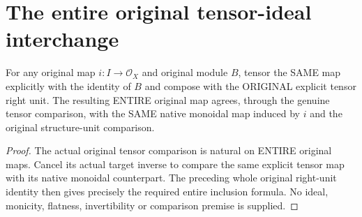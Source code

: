 \section{The entire original tensor-ideal interchange}

\begin{lemma}\label{sc0-tensor-ideal-shuffle:inclusion}
\leanok
{}
For any original map $i:I\to\mathcal O_X$ and original module $B$, tensor the SAME map explicitly with the identity of $B$ and compose with the ORIGINAL explicit tensor right unit. The resulting ENTIRE original map agrees, through the genuine tensor comparison, with the SAME native monoidal map induced by $i$ and the original structure-unit comparison.
\end{lemma}
\begin{proof}
The actual original tensor comparison is natural on ENTIRE original maps. Cancel its actual target inverse to compare the same explicit tensor map with its native monoidal counterpart. The preceding whole original right-unit identity then gives precisely the required entire inclusion formula. No ideal, monicity, flatness, invertibility or comparison premise is supplied.
\end{proof}

